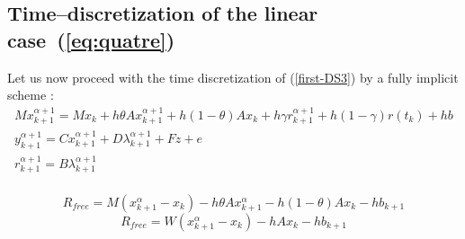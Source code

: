  

\subsection{Time--discretization of the linear case~(\ref{eq:quatre}) } 

Let us now proceed with the time discretization of (\ref{first-DS3}) by a fully implicit scheme : 
\begin{equation}
  \begin{array}{l}
    \label{eq:toto1-DS3}
     M x^{\alpha+1}_{k+1} = M x_{k} +h\theta A x^{\alpha+1}_{k+1}+h(1-\theta) A x_k + h \gamma r^{\alpha+1}_{k+1}+ h(1-\gamma)r(t_k)  +hb\\[2mm]
     y^{\alpha+1}_{k+1} =  C x^{\alpha+1}_{k+1} + D \lambda ^{\alpha+1}_{k+1} +Fz +e\\[2mm]
     r^{\alpha+1}_{k+1} = B \lambda ^{\alpha+1}_{k+1} \\[2mm]
  \end{array}
\end{equation}

\[R_{free} = M(x^{\alpha}_{k+1} - x_{k}) -h\theta A x^{\alpha}_{k+1} - h(1-\theta) A x_k -hb_{k+1} \]
\[R_{free} = W(x^{\alpha}_{k+1} - x_{k}) -h A x_{k} -hb_{k+1} \]


